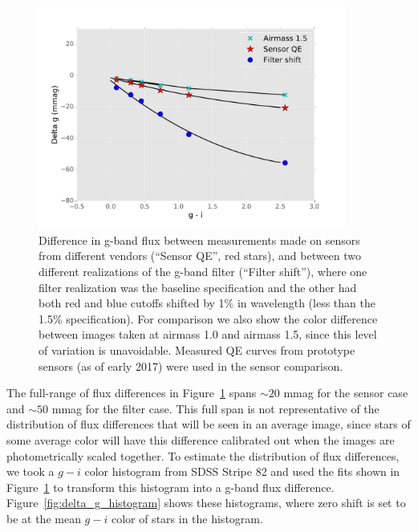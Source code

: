 \documentclass[DM]{lsstdoc}
\begin{document}
\begin{figure}
\includegraphics[width=0.9\textwidth]{figures/delta_g_vs_color.pdf}
\caption{Difference in g-band flux between measurements made on sensors from
different vendors (``Sensor QE'', red stars), and between two different
realizations of the g-band filter (``Filter shift''), where one filter
realization was the baseline specification and the other had both red and blue
cutoffs shifted by 1\% in wavelength (less than the 1.5\% specification). For
comparison we also show the color difference between images taken at airmass 1.0
and airmass 1.5, since this level of variation is unavoidable. Measured QE
curves from prototype sensors (as of early 2017) were used in the sensor
comparison.
\label{fig:delta_g_vs_color}}
\end{figure}

The full-range of flux differences in Figure~\ref{fig:delta_g_vs_color} spans
$\sim 20$ mmag for the sensor case and $\sim 50$ mmag for the filter case. This
full span is not representative of the distribution of flux differences that
will be seen in an average image, since stars of some average color will have
this difference calibrated out when the images are photometrically scaled
together. To estimate the distribution of flux differences, we took a $g-i$
color histogram from SDSS Stripe 82 and used the fits shown in
Figure~\ref{fig:delta_g_vs_color} to transform this histogram into a g-band flux
difference. Figure~\ref{fig:delta_g_histogram} shows these histograms, where zero
shift is set to be at the mean $g-i$ color of stars in the histogram.
\end{document}
